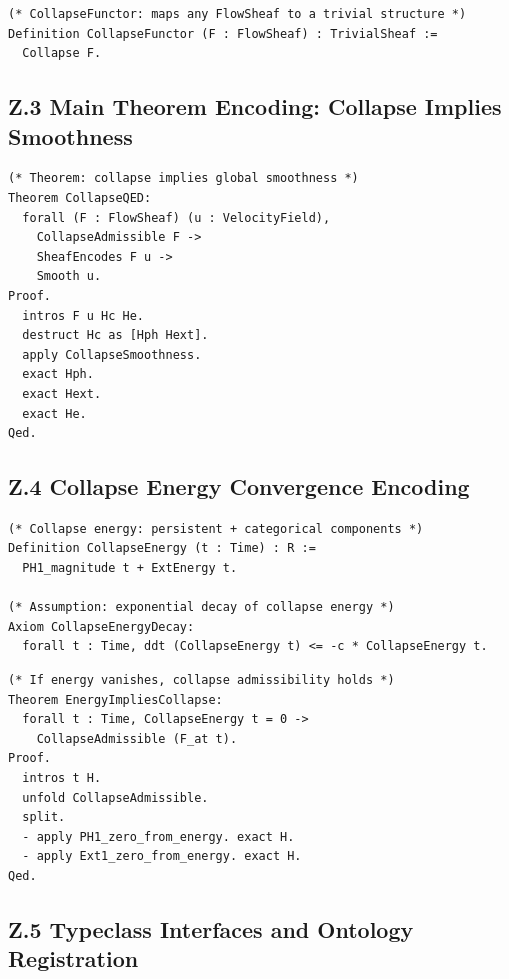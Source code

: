 \documentclass[11pt]{article}
\begin{document}
\begin{lstlisting}[language=Coq, caption={Collapse Functor (Structural Trivialization)}]
(* CollapseFunctor: maps any FlowSheaf to a trivial structure *)
Definition CollapseFunctor (F : FlowSheaf) : TrivialSheaf :=
  Collapse F.
\end{lstlisting}

\subsection*{Z.3 Main Theorem Encoding: Collapse Implies Smoothness}

\begin{lstlisting}[language=Coq, caption={Typed Collapse Q.E.D. Theorem}]
(* Theorem: collapse implies global smoothness *)
Theorem CollapseQED:
  forall (F : FlowSheaf) (u : VelocityField),
    CollapseAdmissible F ->
    SheafEncodes F u ->
    Smooth u.
Proof.
  intros F u Hc He.
  destruct Hc as [Hph Hext].
  apply CollapseSmoothness.
  exact Hph.
  exact Hext.
  exact He.
Qed.
\end{lstlisting}

\subsection*{Z.4 Collapse Energy Convergence Encoding}

\begin{lstlisting}[language=Coq, caption={Collapse Energy Functional and Decay Property}]
(* Collapse energy: persistent + categorical components *)
Definition CollapseEnergy (t : Time) : R :=
  PH1_magnitude t + ExtEnergy t.

(* Assumption: exponential decay of collapse energy *)
Axiom CollapseEnergyDecay:
  forall t : Time, ddt (CollapseEnergy t) <= -c * CollapseEnergy t.
\end{lstlisting}

\begin{lstlisting}[language=Coq, caption={Collapse Admissibility by Energy Decay}]
(* If energy vanishes, collapse admissibility holds *)
Theorem EnergyImpliesCollapse:
  forall t : Time, CollapseEnergy t = 0 ->
    CollapseAdmissible (F_at t).
Proof.
  intros t H.
  unfold CollapseAdmissible.
  split.
  - apply PH1_zero_from_energy. exact H.
  - apply Ext1_zero_from_energy. exact H.
Qed.
\end{lstlisting}

\subsection*{Z.5 Typeclass Interfaces and Ontology Registration}
\end{document}
